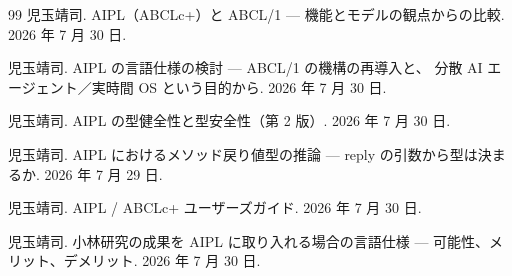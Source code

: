 \documentclass[11pt,a4paper]{ltjsarticle}
\theoremstyle{definition}
\theoremstyle{remark}
\begin{document}
\begin{thebibliography}{99}
児玉靖司.
\newblock AIPL（ABCLc+）と ABCL/1 --- 機能とモデルの観点からの比較. 2026 年 7 月 30 日.

児玉靖司.
\newblock AIPL の言語仕様の検討 --- ABCL/1 の機構の再導入と、
分散 AI エージェント／実時間 OS という目的から. 2026 年 7 月 30 日.

児玉靖司.
\newblock AIPL の型健全性と型安全性（第 2 版）. 2026 年 7 月 30 日.

児玉靖司.
\newblock AIPL におけるメソッド戻り値型の推論 --- reply の引数から型は決まるか.
2026 年 7 月 29 日.

児玉靖司.
\newblock AIPL / ABCLc+ ユーザーズガイド. 2026 年 7 月 30 日.

児玉靖司.
\newblock 小林研究の成果を AIPL に取り入れる場合の言語仕様 ---
可能性、メリット、デメリット. 2026 年 7 月 30 日.

\end{thebibliography}
\end{document}
